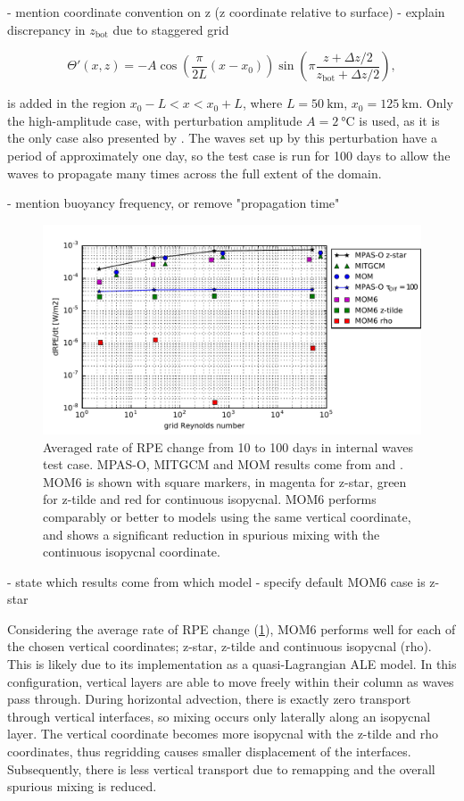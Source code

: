 - mention coordinate convention on z (z coordinate relative to surface)
- explain discrepancy in $z_\text{bot}$ due to staggered grid

\begin{equation}
  \Theta'(x,z) = -A\cos\left(\frac{\pi}{2L}(x - x_0)\right) \sin\left(\pi\frac{z + \Delta z/2}{z_\text{bot} + \Delta z/2}\right),
\end{equation}

is added in the region $x_0 - L < x < x_0 + L$, where $L = \SI{50}{\kilo\metre}$, $x_0 = \SI{125}{\kilo\metre}$. Only the high-amplitude case, with perturbation amplitude $A = \SI{2}{\celsius}$ is used, as it is the only case also presented by \citet{petersen15}. The waves set up by this perturbation have a period of approximately one day, so the test case is run for 100 days to allow the waves to propagate many times across the full extent of the domain.

- mention buoyancy frequency, or remove "propagation time"

\begin{figure}
  \includegraphics{../plots/internal_waves_drpe.pdf}
  \caption{\label{fig:waves-drpe} Averaged rate of RPE change from 10 to 100 days in internal waves test case. MPAS-O, MITGCM and MOM results come from \citet{petersen15} and \citet{ilicak12}. MOM6 is shown with square markers, in magenta for z-star, green for z-tilde and red for continuous isopycnal. MOM6 performs comparably or better to models using the same vertical coordinate, and shows a significant reduction in spurious mixing with the continuous isopycnal coordinate.}
\end{figure}

- state which results come from which model
- specify default MOM6 case is z-star

Considering the average rate of RPE change (\cref{fig:waves-drpe}), MOM6 performs well for each of the chosen vertical coordinates; z-star, z-tilde and continuous isopycnal (rho). This is likely due to its implementation as a quasi-Lagrangian ALE model. In this configuration, vertical layers are able to move freely within their column as waves pass through. During horizontal advection, there is exactly zero transport through vertical interfaces, so mixing occurs only laterally along an isopycnal layer. The vertical coordinate becomes more isopycnal with the z-tilde and rho coordinates, thus regridding causes smaller displacement of the interfaces. Subsequently, there is less vertical transport due to remapping and the overall spurious mixing is reduced.

